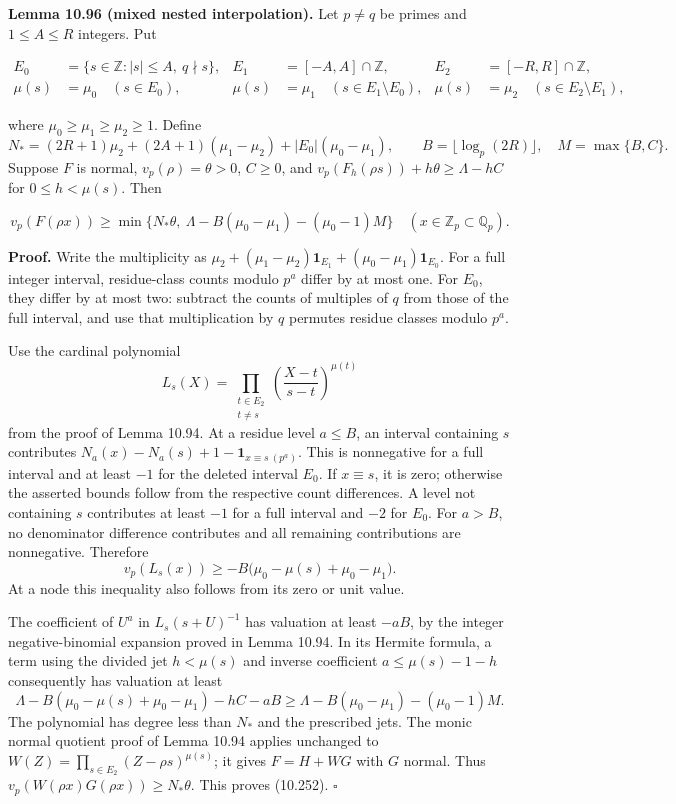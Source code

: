 \documentclass[
  11pt,
  a4paper,
]{article}
\begin{document}
\textbf{Lemma 10.96 (mixed nested interpolation).} Let \(p\ne q\) be
primes and \(1\le A\le R\) integers. Put

\[
\begin{aligned}
E_0&=\{s\in\mathbb Z:|s|\le A,\ q\nmid s\},&
E_1&=[-A,A]\cap\mathbb Z,&E_2&=[-R,R]\cap\mathbb Z,\\
\mu(s)&=\mu_0\quad(s\in E_0),&
\mu(s)&=\mu_1\quad(s\in E_1\setminus E_0),&
\mu(s)&=\mu_2\quad(s\in E_2\setminus E_1),
\end{aligned}
\tag{10.251}
\]

where \(\mu_0\ge\mu_1\ge\mu_2\ge1\). Define \[
N_*=(2R+1)\mu_2+(2A+1)(\mu_1-\mu_2)
+|E_0|(\mu_0-\mu_1),\qquad
B=\lfloor\log_p(2R)\rfloor,\quad M=\max\{B,C\}.
\] Suppose \(F\) is normal, \(v_p(\rho)=\theta>0\), \(C\ge0\), and
\(v_p(F_h(\rho s))+h\theta\ge\Lambda-hC\) for \(0\le h<\mu(s)\). Then

\[
v_p(F(\rho x))\ge
\min\{N_*\theta,\ \Lambda-B(\mu_0-\mu_1)-(\mu_0-1)M\}
\quad(x\in\mathbb Z_p\subset\mathbb Q_p).
\tag{10.252}
\]

\textbf{Proof.} Write the multiplicity as
\(\mu_2+(\mu_1-\mu_2)\mathbf1_{E_1}+(\mu_0-\mu_1)\mathbf1_{E_0}\). For a
full integer interval, residue-class counts modulo \(p^a\) differ by at
most one. For \(E_0\), they differ by at most two: subtract the counts
of multiples of \(q\) from those of the full interval, and use that
multiplication by \(q\) permutes residue classes modulo \(p^a\).

Use the cardinal polynomial \[
L_s(X)=\prod_{\substack{t\in E_2\\t\ne s}}
\left(\frac{X-t}{s-t}\right)^{\mu(t)}
\] from the proof of Lemma 10.94. At a residue level \(a\le B\), an
interval containing \(s\) contributes
\(N_a(x)-N_a(s)+1-\mathbf1_{x\equiv s\ (p^a)}\). This is nonnegative for
a full interval and at least \(-1\) for the deleted interval \(E_0\). If
\(x\equiv s\), it is zero; otherwise the asserted bounds follow from the
respective count differences. A level not containing \(s\) contributes
at least \(-1\) for a full interval and \(-2\) for \(E_0\). For \(a>B\),
no denominator difference contributes and all remaining contributions
are nonnegative. Therefore \[
v_p(L_s(x))\ge
-B\bigl(\mu_0-\mu(s)+\mu_0-\mu_1\bigr).
\] At a node this inequality also follows from its zero or unit value.

The coefficient of \(U^a\) in \(L_s(s+U)^{-1}\) has valuation at least
\(-aB\), by the integer negative-binomial expansion proved in Lemma
10.94. In its Hermite formula, a term using the divided jet \(h<\mu(s)\)
and inverse coefficient \(a\le\mu(s)-1-h\) consequently has valuation at
least \[
\Lambda-B(\mu_0-\mu(s)+\mu_0-\mu_1)-hC-aB
\ge\Lambda-B(\mu_0-\mu_1)-(\mu_0-1)M.
\] The polynomial has degree less than \(N_*\) and the prescribed jets.
The monic normal quotient proof of Lemma 10.94 applies unchanged to
\(W(Z)=\prod_{s\in E_2}(Z-\rho s)^{\mu(s)}\); it gives \(F=H+WG\) with
\(G\) normal. Thus \(v_p(W(\rho x)G(\rho x))\ge N_*\theta\). This proves
(10.252). \(\square\)
\end{document}

